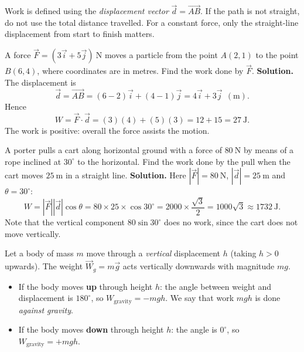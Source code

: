 \documentclass[11pt]{article}
\newcounter{popsec}
\newcounter{popsub}
\newcommand{\courssub}[1]{%
  \stepcounter{popsub}%
  \par\vspace{9pt}\noindent{\popxbold\fontsize{11.5}{13}\selectfont\color{popink}{\color{poporange}\thepopsec.\thepopsub}\hspace{6pt}#1}\par\nopagebreak\vspace{4pt}
}
\begin{document}
\begin{attention}
Work is defined using the \emph{displacement vector} $\vec{d} = \overrightarrow{AB}$. If the path is not straight, do not use the total distance travelled. For a constant force, only the straight-line displacement from start to finish matters.
\end{attention}

\begin{exoresolu}
A force $\vec{F} = (3\vec{i} + 5\vec{j})\ \mathrm{N}$ moves a particle from the point $A(2,1)$ to the point $B(6,4)$, where coordinates are in metres. Find the work done by $\vec{F}$.
\tcblower
\textbf{Solution.} The displacement is
\[
\vec{d} = \overrightarrow{AB} = (6-2)\vec{i} + (4-1)\vec{j} = 4\vec{i} + 3\vec{j}\ \ (\mathrm{m}).
\]
Hence
\[
W = \vec{F}\cdot\vec{d} = (3)(4) + (5)(3) = 12 + 15 = 27\ \mathrm{J}.
\]
The work is positive: overall the force assists the motion.
\end{exoresolu}

\begin{exoresolu}
A porter pulls a cart along horizontal ground with a force of $80\ \mathrm{N}$ by means of a rope inclined at $30^{\circ}$ to the horizontal. Find the work done by the pull when the cart moves $25\ \mathrm{m}$ in a straight line.
\tcblower
\textbf{Solution.} Here $|\vec{F}| = 80\ \mathrm{N}$, $|\vec{d}| = 25\ \mathrm{m}$ and $\theta = 30^{\circ}$:
\[
W = |\vec{F}||\vec{d}|\cos\theta = 80 \times 25 \times \cos 30^{\circ} = 2000 \times \frac{\sqrt{3}}{2} = 1000\sqrt{3} \approx 1732\ \mathrm{J}.
\]
Note that the vertical component $80\sin 30^{\circ}$ does no work, since the cart does not move vertically.
\end{exoresolu}

\courssub{Work done by gravity}

Let a body of mass $m$ move through a \emph{vertical} displacement $h$ (taking $h > 0$ upwards). The weight $\vec{W}_g = m\vec{g}$ acts vertically downwards with magnitude $mg$.

\begin{itemize}
\item If the body moves \textbf{up} through height $h$: the angle between weight and displacement is $180^{\circ}$, so $W_{\text{gravity}} = -mgh$. We say that work $mgh$ is done \emph{against gravity}.
\item If the body moves \textbf{down} through height $h$: the angle is $0^{\circ}$, so $W_{\text{gravity}} = +mgh$.
\end{itemize}
\end{document}
